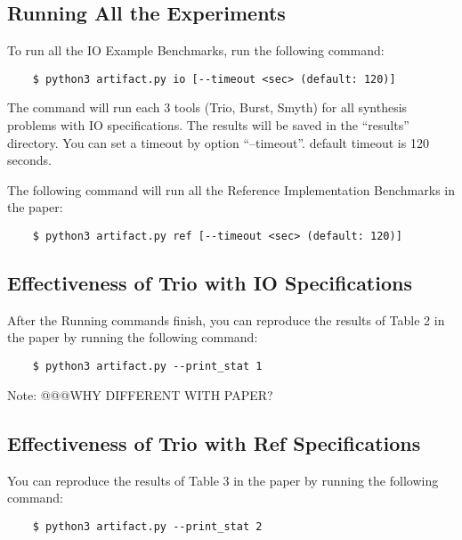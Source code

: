 \documentclass{article}
\begin{document}
\subsection{Running All the Experiments}
To run all the IO Example Benchmarks, run the following command:
\begin{lstlisting}
    $ python3 artifact.py io [--timeout <sec> (default: 120)]
\end{lstlisting}

The command will run each 3 tools (Trio, Burst, Smyth) for all synthesis problems with IO specifications. The results will be saved in the ``results'' directory. You can set a timeout by option ``--timeout''. default timeout is 120 seconds.

The following command will run all the Reference Implementation Benchmarks in the paper:
\begin{lstlisting}
    $ python3 artifact.py ref [--timeout <sec> (default: 120)]
\end{lstlisting}

\subsection{Effectiveness of Trio with IO Specifications}
After the Running commands finish, you can reproduce the results of Table 2 in the paper by running the following command:
\begin{lstlisting}
    $ python3 artifact.py --print_stat 1
\end{lstlisting}
Note: @@@WHY DIFFERENT WITH PAPER?
\subsection{Effectiveness of Trio with Ref Specifications}
You can reproduce the results of Table 3 in the paper by running the following command:
\begin{lstlisting}
    $ python3 artifact.py --print_stat 2
\end{lstlisting}
\end{document}
